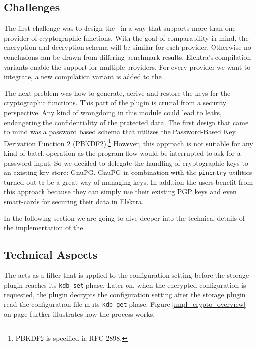 \subsection{Challenges}

The first challenge was to design the \crypto ~in a way that supports more than one provider of cryptographic functions.
With the goal of comparability in mind, the encryption and decryption schema will be similar for each provider.
Otherwise no conclusions can be drawn from differing benchmark results.
Elektra's compilation variants enable the support for multiple providers.
For every provider we want to integrate, a new compilation variant is added to the \crypto.

The next problem was how to generate, derive and restore the keys for the cryptographic functions.
This part of the plugin is crucial from a security perspective.
Any kind of wrongdoing in this module could lead to leaks, endangering the confidentiality of the protected data.
The first design that came to mind was a password based schema that utilizes the Password-Based Key Derivation Function 2 (PBKDF2).\footnote{PBKDF2 is specified in RFC 2898.}
However, this approach is not suitable for any kind of batch operation as the program flow would be interrupted to ask for a password input.
So we decided to delegate the handling of cryptographic keys to an existing key store: GnuPG.
GnuPG in combination with the \texttt{pinentry} utilities turned out to be a great way of managing keys.
In addition the users benefit from this approach because they can simply use their existing PGP keys and even smart-cards for securing their data in Elektra.

In the following section we are going to dive deeper into the technical details of the implementation of the \crypto.

\subsection{Technical Aspects}

The \crypto{} acts as a filter that is applied to the configuration setting before the storage plugin reaches its \texttt{kdb set} phase.
Later on, when the encrypted configuration is requested, the plugin decrypts the configuration setting after the storage plugin read the configuration file in its \texttt{kdb get} phase.
Figure \ref{impl_crypto_overview} on page \pageref{impl_crypto_overview} further illustrates how the process works.


